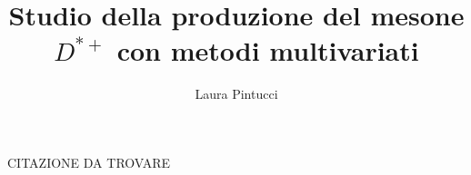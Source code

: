\documentclass[11pt,a4paper, twoside]{report}
\title{Studio della produzione del mesone $D^{*+}$ con metodi multivariati}
\author{Laura Pintucci}
\begin{document}

\thispagestyle{empty} 

\cleardoublepage



\thispagestyle{empty} 
\begin{flushright}%
\null {}

CITAZIONE DA TROVARE

\null
\end{flushright}





 


\tableofcontents












\end{document}
